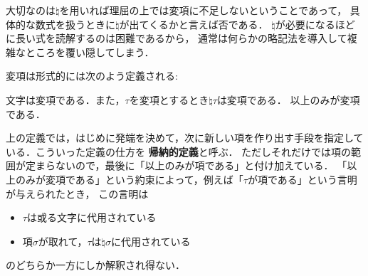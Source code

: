 	大切なのは$\natural$を用いれば理屈の上では変項に不足しないということであって，
	具体的な数式を扱うときに$\natural$が出てくるかと言えば否である．
	$\natural$が必要になるほどに長い式を読解するのは困難であるから，
	通常は何らかの略記法を導入して複雑なところを覆い隠してしまう．
	
	変項は形式的には次のよう定義される:
	
	\begin{screen}
		\begin{metadfn}[変項]
			文字は変項である．また，$\tau$を変項とするとき$\natural \tau$は変項である．
			以上のみが変項である．
		\end{metadfn}
	\end{screen}
	
	上の定義では，はじめに発端を決めて，次に新しい項を作り出す手段を指定している．こういった定義の仕方を
	{\bf 帰納的定義}と呼ぶ．
	ただしそれだけでは項の範囲が定まらないので，最後に「以上のみが項である」と付け加えている．
	「以上のみが変項である」という約束によって，例えば「$\tau$が項である」という言明が与えられたとき，
	この言明は
	\begin{itemize}
		\item $\tau$は或る文字に代用されている
		\item 項$\sigma$が取れて\footnotemark，$\tau$は$\natural \sigma$に代用されている
	\end{itemize}
	のどちらか一方にしか解釈され得ない．
	
	

